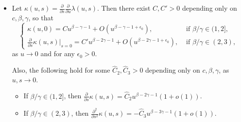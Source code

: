 \documentclass[10pt,a4paper]{amsart}
\newcommand{\eps}{{\epsilon}}
\begin{document}
\begin{lemma}
\begin{itemize}
\begin{itemize}
\begin{itemize}
   \item[(**)] If $\beta/\gamma=2$, then $\frac{\partial}{\partial s} e(u,s)= o(u^{\beta-\gamma-1})+o(\log(1/s))$. Also, $\frac{\partial}{\partial s} e(0,s)=o(\log(1/s))$.
    
   \item[(***)] If $\beta/\gamma\in (2,3)$, then $\frac{\partial}{\partial s} e(u,s)= o(u^{\beta-\gamma-2})+o(s^{\beta/\gamma-3})$.   Also, $\frac{\partial}{\partial s} e(0,s)= o(s^{\beta/\gamma-3})$.    \end{itemize}
    \end{itemize}

  
  \item[(iii)] Let
  $\kappa(u,s)=\frac{\partial}{\partial s}\frac{\partial}{\partial u}\lambda(u,s)$.
  Then there exist $C, C'>0$ depending only on $c,\beta,\gamma$,
  so that
  $$
  \begin{cases}
  \kappa(u,0)=C u^{\beta-\gamma-1} + O(u^{\beta-\gamma-1+\eps_0}), & \text{ if } \beta/\gamma\in (1,2], \\
  \frac{\partial}{\partial s}\kappa(u,s)\Big|_{s=0}=C' u^{\beta-2\gamma-1} + O(u^{\beta-2\gamma-1+\eps_0}), & \text{  if } \beta/\gamma\in (2,3),
  \end{cases}
  $$
   as $u\to 0$ and for any $\eps_0>0$.
   
   
   Also, the following hold for some $\hat C_2, \hat C_3>0$ depending only on $c,\beta,\gamma$, as $u,s\to 0$.
   \begin{itemize}
    \item[(*)] If $\beta/\gamma\in (1,2]$, then $\frac{\partial}{\partial s}\kappa(u,s)=\hat C_2 u^{\beta-2\gamma-1}(1+o(1))$.
    \item[(**)] If $\beta/\gamma\in (2,3)$, then $\frac{\partial^2}{\partial s^2}\kappa(u,s)=-\hat C_3 u^{\beta-3\gamma-1}(1+o(1))$.    \end{itemize}
    \end{itemize}
\end{lemma}
\end{document}

